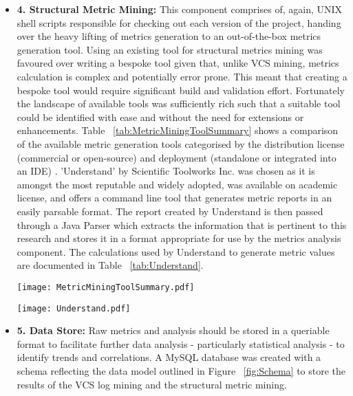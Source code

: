 \begin{itemize}
\item \textbf{4. Structural Metric Mining:} This component comprises of, again, UNIX shell scripts responsible for checking out each version of the project, handing over the heavy lifting of metrics generation to an out-of-the-box metrics generation tool. Using an existing tool for structural metrics mining was favoured over writing a bespoke tool given that, unlike VCS mining, metrics calculation is complex and potentially error prone. This meant that creating a bespoke tool would require significant build and validation effort. Fortunately the landscape of available tools was sufficiently rich such that a suitable tool could be identified with ease and without the need for extensions or enhancements. Table ~\ref{tab:MetricMiningToolSummary} shows a comparison of the available metric generation tools categorised by the distribution license (commercial or open-source) and deployment (standalone or integrated into an IDE) \citep{spinellis2005tool, scitools, powersoftware, metricssourceforge, ndepend}. 'Understand' by Scientific Toolworks Inc. was chosen as it is amongst the most reputable and widely adopted, was available on academic license, and offers a command line tool that generates metric reports in an easily parsable format. The report created by Understand is then passed through a Java Parser which extracts the information that is pertinent to this research and stores it in a format appropriate for use by the metrics analysis component. The calculations used by Understand to generate metric values are documented in Table ~\ref{tab:Understand}.

\begin{table}
\centering 
{}
\begin{tabular}
 \centering 
 \texttt{[image: MetricMiningToolSummary.pdf]}
 \label{tab:MetricMiningToolSummary}
\end{tabular}
\end{table}

\begin{table}
\centering 
{}
\begin{tabular}
 \centering 
 \texttt{[image: Understand.pdf]}
 \label{tab:Understand}
\end{tabular}
\end{table}

\item \textbf{5. Data Store:} Raw metrics and analysis should be stored in a queriable format to facilitate further data analysis - particularly statistical analysis - to identify trends and correlations. A MySQL database was created with a schema reflecting the data model outlined in Figure ~\ref{fig:Schema} to store the results of the VCS log mining and the structural metric mining. 
 

\end{itemize}
